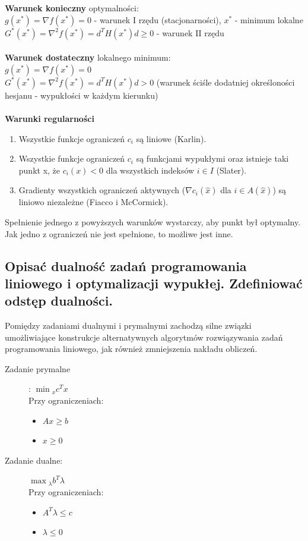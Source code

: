 \textbf{Warunek konieczny} optymalności:\\
$g(x^*) = \nabla f(x^*)=0$ - warunek I rzędu (stacjonarności), $x^*$ - minimum lokalne\\
$G^*(x^*) = \nabla^2f(x^*) = d^TH(x^*)d\geq{}0$ - warunek II rzędu 
\\\\

\textbf{Warunek dostateczny} lokalnego minimum:\\
$g(x^*) = \nabla f(x^*)=0$\\
$G^*(x^*) = \nabla^2f(x^*) = d^TH(x^*)d>0$ (warunek ściśle dodatniej określoności hesjanu - wypukłości w każdym kierunku)
\\\\

\textbf{Warunki regularności}
\begin{enumerate}
    \item Wszystkie funkcje ograniczeń $c_i$ są liniowe (Karlin).
    \item Wszystkie funkcje ograniczeń $c_i$ są funkcjami wypukłymi oraz istnieje taki punkt x, że $c_i(x) < 0$ dla wszystkich indeksów $i\in I$ (Slater).
    \item Gradienty wszystkich ograniczeń aktywnych ($\nabla c_i(\hat{x})$ dla $i\in A(\hat{x})$) są liniowo niezależne (Fiacco i McCormick).
\end{enumerate}

Spełnienie jednego z powyższych warunków wystarczy, aby punkt był optymalny. Jak jedno z ograniczeń nie jest spełnione, to możliwe jest inne.


\subsection{Opisać dualność zadań programowania liniowego i optymalizacji wypukłej. Zdefiniować odstęp dualności.}
Pomiędzy zadaniami dualnymi i prymalnymi zachodzą silne związki umożliwiające konstrukcje alternatywnych algorytmów rozwiązywania zadań programowania liniowego, jak również zmniejszenia nakładu obliczeń.

\begin{description}
    \item[Zadanie prymalne]: $\min{}_x c^Tx$\mbox{}\\
    Przy ograniczeniach:
    \begin{itemize}
        \item $Ax\geq b$
        \item $x\geq 0$
    \end{itemize}
    \item[Zadanie dualne:] $\max{}_\lambda b^T\lambda$\mbox{}\\
    Przy ograniczeniach:
    \begin{itemize}
        \item $A^T\lambda \leq c$
        \item $\lambda \leq 0$
    \end{itemize}
\end{description}

